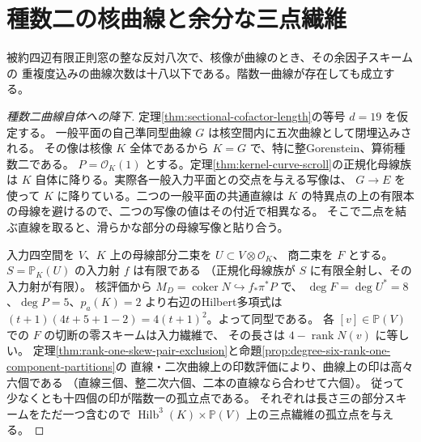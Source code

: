 \section{種数二の核曲線と余分な三点繊維}
\label{sec:genus-two-kernel-excess}
\begin{theorem}\label{thm:genus-two-kernel-excess}
被約四辺有限正則窓の整な反対八次で、核像が曲線のとき、その余因子スキームの
重複度込みの曲線次数は十八以下である。階数一曲線が存在しても成立する。
\end{theorem}
\begin{proof}[種数二曲線自体への降下]
定理\ref{thm:sectional-cofactor-length}の等号 $d=19$ を仮定する。
一般平面の自己準同型曲線 $G$ は核空間内に五次曲線として閉埋込みされる。
その像は核像 $K$ 全体であるから $K=G$ で、特に整Gorenstein、算術種数二である。
$P=\mathcal O_K(1)$ とする。定理\ref{thm:kernel-curve-scroll}の正規化母線族は
$K$ 自体に降りる。実際各一般入力平面との交点を与える写像は、
$G\to E$ を使って $K$ に降りている。二つの一般平面の共通直線は
$K$ の特異点の上の有限本の母線を避けるので、二つの写像の値はその付近で相異なる。
そこで二点を結ぶ直線を取ると、滑らかな部分の母線写像と貼り合う。

入力四空間を $V$、$K$ 上の母線部分二束を $U\subset V\otimes\mathcal O_K$、
商二束を $F$ とする。$S=\mathbb P_K(U)$ の入力射 $f$ は有限である
（正規化母線族が $S$ に有限全射し、その入力射が有限）。
核評価から $M_D=\operatorname{coker}N\hookrightarrow f_*\pi^*P$ で、
$\deg F=\deg U^*=8$、$\deg P=5$、$p_a(K)=2$ より右辺のHilbert多項式は
$(t+1)(4t+5+1-2)=4(t+1)^2$。よって同型である。
各 $[v]\in\mathbb P(V)$ での $F$ の切断の零スキームは入力繊維で、
その長さは $4-\operatorname{rank}N(v)$ に等しい。
定理\ref{thm:rank-one-skew-pair-exclusion}と命題\ref{prop:degree-six-rank-one-component-partitions}の
直線・二次曲線上の印数評価により、曲線上の印は高々六個である
（直線三個、整二次六個、二本の直線なら合わせて六個）。
従って少なくとも十四個の印が階数一の孤立点である。
それぞれは長さ三の部分スキームをただ一つ含むので
$\operatorname{Hilb}^3(K)\times\mathbb P(V)$ 上の三点繊維の孤立点を与える。

\end{proof}
